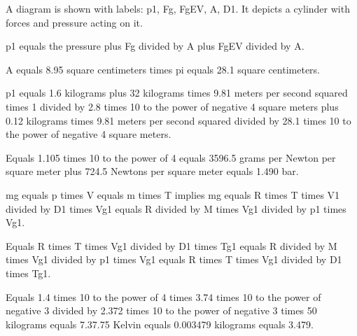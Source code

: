 A diagram is shown with labels: p1, Fg, FgEV, A, D1. It depicts a cylinder with forces and pressure acting on it.

p1 equals the pressure plus Fg divided by A plus FgEV divided by A.

A equals 8.95 square centimeters times pi equals 28.1 square centimeters.

p1 equals 1.6 kilograms plus 32 kilograms times 9.81 meters per second squared times 1 divided by 2.8 times 10 to the power of negative 4 square meters plus 0.12 kilograms times 9.81 meters per second squared divided by 28.1 times 10 to the power of negative 4 square meters.

Equals 1.105 times 10 to the power of 4 equals 3596.5 grams per Newton per square meter plus 724.5 Newtons per square meter equals 1.490 bar.

mg equals p times V equals m times T implies mg equals R times T times V1 divided by D1 times Vg1 equals R divided by M times Vg1 divided by p1 times Vg1.

Equals R times T times Vg1 divided by D1 times Tg1 equals R divided by M times Vg1 divided by p1 times Vg1 equals R times T times Vg1 divided by D1 times Tg1.

Equals 1.4 times 10 to the power of 4 times 3.74 times 10 to the power of negative 3 divided by 2.372 times 10 to the power of negative 3 times 50 kilograms equals 7.37.75 Kelvin equals 0.003479 kilograms equals 3.479.
